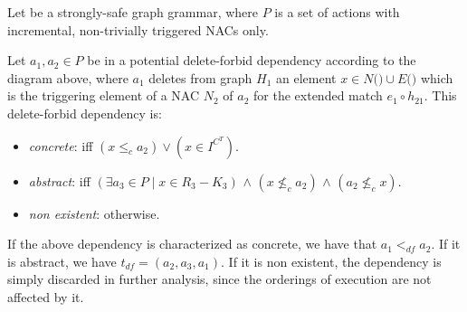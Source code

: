 \begin{definition}\label{def:delete-forbid-strong} Let \doublyTypedGraphGrammarCore{} be a strongly-safe graph grammar, where $P$ is a set of actions with incremental, non-trivially triggered NACs only.

\hfill

  Let $a_1, a_2 \in P$ be in a potential delete-forbid dependency according to the diagram above, where $a_1$ deletes from graph $H_1$ an element $x \in N($\coreGraph$) \cup E($\coreGraph$)$ which is the triggering element of a NAC $N_2$ of $a_2$ for the extended match $e_1 \circ h_{21}$. This delete-forbid dependency is:

\begin{itemize}
  \item \emph{concrete}: iff $(x \leq_c a_2) \lor (x \in I^{C^T})$.%
  \item \emph{abstract}: iff $(\exists a_3 \in P \mid x \in R_3 - K_3)$ $\land$ $(x \not\leq_c a_2)$ $\land$ $(a_2 \not\leq_c x)$.%
  \item \emph{non existent}: otherwise.
\end{itemize}

  If the above dependency is characterized as concrete, we have that \mbox{$a_1 <_{df} a_2$}. If it is abstract, we have $t_{df} = (a_2, a_3, a_1)$. If it is non existent, the dependency is simply discarded in further analysis, since the orderings of execution are not affected by it.

\end{definition}

